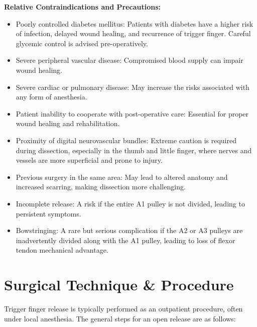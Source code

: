 \textbf{Relative Contraindications and Precautions:}
\begin{itemize}
  \item Poorly controlled diabetes mellitus: Patients with diabetes have a higher risk of infection, delayed wound healing, and recurrence of trigger finger. Careful glycemic control is advised pre-operatively.
  
  \item Severe peripheral vascular disease: Compromised blood supply can impair wound healing.
  
  \item Severe cardiac or pulmonary disease: May increase the risks associated with any form of anesthesia.
  
  \item Patient inability to cooperate with post-operative care: Essential for proper wound healing and rehabilitation.
  
  \item Proximity of digital neurovascular bundles: Extreme caution is required during dissection, especially in the thumb and little finger, where nerves and vessels are more superficial and prone to injury.
  
  \item Previous surgery in the same area: May lead to altered anatomy and increased scarring, making dissection more challenging.
  
  \item Incomplete release: A risk if the entire A1 pulley is not divided, leading to persistent symptoms.
  
  \item Bowstringing: A rare but serious complication if the A2 or A3 pulleys are inadvertently divided along with the A1 pulley, leading to loss of flexor tendon mechanical advantage.
\end{itemize}

\section*{Surgical Technique \& Procedure}
Trigger finger release is typically performed as an outpatient procedure, often under local anesthesia. The general steps for an open release are as follows:

